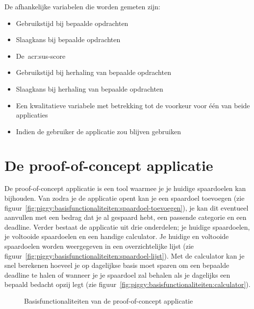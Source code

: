 De afhankelijke variabelen die worden gemeten zijn:
\begin{itemize}
    \item Gebruikstijd bij bepaalde opdrachten
    \item Slaagkans bij bepaalde opdrachten
    \item De~\acrshort{acr:sus}-score
    \item Gebruikstijd bij herhaling van bepaalde opdrachten
    \item Slaagkans bij herhaling van bepaalde opdrachten
    \item Een kwalitatieve variabele met betrekking tot de voorkeur voor één van beide applicaties
    \item Indien de gebruiker de applicatie zou blijven gebruiken
\end{itemize}

\section{De proof-of-concept applicatie}
\label{sec:applicatie}

De proof-of-concept applicatie is een tool waarmee je je huidige spaardoelen kan bijhouden. Van zodra je de applicatie opent kan je een spaardoel toevoegen (zie figuur~\ref{fig:piggy:basisfunctionaliteiten:spaardoel-toevoegen}), je kan dit eventueel aanvullen met een bedrag dat je al gespaard hebt, een passende categorie en een deadline. Verder bestaat de applicatie uit drie onderdelen; je huidige spaardoelen, je voltooide spaardoelen en een handige calculator. Je huidige en voltooide spaardoelen worden weergegeven in een overzichtelijke lijst (zie figuur~\ref{fig:piggy:basisfunctionaliteiten:spaardoel-lijst}). Met de calculator kan je snel berekenen hoeveel je op dagelijkse basis moet sparen om een bepaalde deadline te halen of wanneer je je spaardoel zal behalen als je dagelijks een bepaald bedacht opzij legt (zie figuur~\ref{fig:piggy:basisfunctionaliteiten:calculator}).

\begin{figure}[h!]
    \centering
    \qquad
    \qquad
    \caption{Basisfunctionaliteiten van de proof-of-concept applicatie}
    \label{fig:piggy:basisfunctionaliteiten}
\end{figure}

